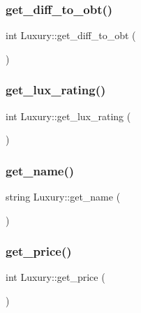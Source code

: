 \subsubsection{\texorpdfstring{get\+\_\+diff\+\_\+to\+\_\+obt()}{get\_diff\_to\_obt()}}
{\footnotesize\ttfamily int Luxury\+::get\+\_\+diff\+\_\+to\+\_\+obt (\begin{DoxyParamCaption}{ }\end{DoxyParamCaption})}

\mbox{\label{classLuxury_af2270c6407954955ac7f1ac71d98e3a6}} 
\subsubsection{\texorpdfstring{get\+\_\+lux\+\_\+rating()}{get\_lux\_rating()}}
{\footnotesize\ttfamily int Luxury\+::get\+\_\+lux\+\_\+rating (\begin{DoxyParamCaption}{ }\end{DoxyParamCaption})}

\mbox{\label{classLuxury_a53c657a65d8cbacf6ad92d1c3a34778b}} 
\subsubsection{\texorpdfstring{get\+\_\+name()}{get\_name()}}
{\footnotesize\ttfamily string Luxury\+::get\+\_\+name (\begin{DoxyParamCaption}{ }\end{DoxyParamCaption})}

\mbox{\label{classLuxury_ad791614afa7a51a373b2eed1c99ab8c2}} 
\subsubsection{\texorpdfstring{get\+\_\+price()}{get\_price()}}
{\footnotesize\ttfamily int Luxury\+::get\+\_\+price (\begin{DoxyParamCaption}{ }\end{DoxyParamCaption})}

